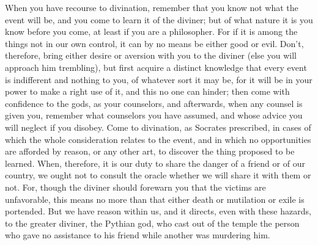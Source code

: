 When you have recourse to divination, remember that you know not what the event
will be, and you come to learn it of  the diviner; but of what nature it is you
know before you come, at least if you are a philosopher. For if it is among the
things not  in our  own control, it  can by  no means be  either good  or evil.
Don't, therefore, bring either desire or aversion with you to the diviner (else
you will approach  him trembling), but first acquire a  distinct knowledge that
every event is indifferent and nothing to  you, of whatever sort it may be, for
it will be in your power to make a right use of it, and this no one can hinder;
then come with confidence to the gods, as your counselors, and afterwards, when
any counsel is given you, remember  what counselors you have assumed, and whose
advice  you will  neglect  if  you disobey.  Come  to  divination, as  Socrates
prescribed, in cases of which the whole consideration relates to the event, and
in which no opportunities are afforded by reason, or any other art, to discover
the thing proposed to be learned. When,  therefore, it is our duty to share the
danger  of a  friend or  of our  country, we  ought not  to consult  the oracle
whether we  will share  it with  them or  not. For,  though the  diviner should
forewarn you  that the victims  are unfavorable, this  means no more  than that
either death or mutilation or exile is portended. But we have reason within us,
and it  directs, even with these  hazards, to the greater  diviner, the Pythian
god, who cast out of the temple the person who gave no assistance to his friend
while another was murdering him.
